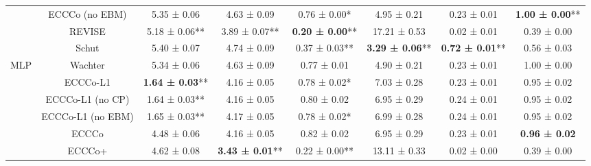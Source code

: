 \begin{table}
{\begin{tabular}[t]{cccccccc}
 & ECCCo (no EBM) & 5.35 ± 0.06\hphantom{*}\hphantom{*} & 4.63 ± 0.09\hphantom{*}\hphantom{*} & 0.76 ± 0.00*\hphantom{*} & 4.95 ± 0.21\hphantom{*}\hphantom{*} & 0.23 ± 0.01\hphantom{*}\hphantom{*} & \textbf{1.00 ± 0.00}**\\

 & REVISE & 5.18 ± 0.06** & 3.89 ± 0.07** & \textbf{0.20 ± 0.00}** & 17.21 ± 0.53\hphantom{*}\hphantom{*} & 0.02 ± 0.01\hphantom{*}\hphantom{*} & 0.39 ± 0.00\hphantom{*}\hphantom{*}\\

 & Schut & 5.40 ± 0.07\hphantom{*}\hphantom{*} & 4.74 ± 0.09\hphantom{*}\hphantom{*} & 0.37 ± 0.03** & \textbf{3.29 ± 0.06}** & \textbf{0.72 ± 0.01}** & 0.56 ± 0.03\hphantom{*}\hphantom{*}\\

\multirow[t]{-10}{*}{\centering\arraybackslash MLP} & Wachter & 5.34 ± 0.06\hphantom{*}\hphantom{*} & 4.63 ± 0.09\hphantom{*}\hphantom{*} & 0.77 ± 0.01\hphantom{*}\hphantom{*} & 4.90 ± 0.21\hphantom{*}\hphantom{*} & 0.23 ± 0.01\hphantom{*}\hphantom{*} & 1.00 ± 0.00\hphantom{*}\hphantom{*}\\
\cmidrule{1-8}
 & ECCCo-L1 & \textbf{1.64 ± 0.03}** & 4.16 ± 0.05\hphantom{*}\hphantom{*} & 0.78 ± 0.02*\hphantom{*} & 7.03 ± 0.28\hphantom{*}\hphantom{*} & 0.23 ± 0.01\hphantom{*}\hphantom{*} & 0.95 ± 0.02\hphantom{*}\hphantom{*}\\

 & ECCCo-L1 (no CP) & 1.64 ± 0.03** & 4.16 ± 0.05\hphantom{*}\hphantom{*} & 0.80 ± 0.02\hphantom{*}\hphantom{*} & 6.95 ± 0.29\hphantom{*}\hphantom{*} & 0.24 ± 0.01\hphantom{*}\hphantom{*} & 0.95 ± 0.02\hphantom{*}\hphantom{*}\\

 & ECCCo-L1 (no EBM) & 1.65 ± 0.03** & 4.17 ± 0.05\hphantom{*}\hphantom{*} & 0.78 ± 0.02*\hphantom{*} & 6.99 ± 0.28\hphantom{*}\hphantom{*} & 0.24 ± 0.01\hphantom{*}\hphantom{*} & 0.95 ± 0.02\hphantom{*}\hphantom{*}\\

 & ECCCo & 4.48 ± 0.06\hphantom{*}\hphantom{*} & 4.16 ± 0.05\hphantom{*}\hphantom{*} & 0.82 ± 0.02\hphantom{*}\hphantom{*} & 6.95 ± 0.29\hphantom{*}\hphantom{*} & 0.23 ± 0.01\hphantom{*}\hphantom{*} & \textbf{0.96 ± 0.02}\hphantom{*}\hphantom{*}\\

 & ECCCo+ & 4.62 ± 0.08\hphantom{*}\hphantom{*} & \textbf{3.43 ± 0.01}** & 0.22 ± 0.00** & 13.11 ± 0.33\hphantom{*}\hphantom{*} & 0.02 ± 0.00\hphantom{*}\hphantom{*} & 0.39 ± 0.00\hphantom{*}\hphantom{*}\\


\end{tabular}}
\end{table}
